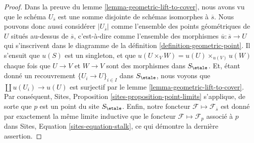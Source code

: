 \begin{proof}
Dans la preuve du
lemme \ref{lemma-geometric-lift-to-cover},
nous avons vu que le sch\'ema $U_{\overline{s}}$ est une somme disjointe de
sch\'emas isomorphes \`a $\overline{s}$. Nous pouvons donc aussi consid\'erer
$|U_{\overline{s}}|$ comme l'ensemble des points g\'eom\'etriques de $U$ situ\'es au-dessus de
$\overline{s}$, c'est-\`a-dire comme l'ensemble des morphismes
$\overline{u} : \overline{s} \to U$ qui s'inscrivent dans le diagramme de la
d\'efinition \ref{definition-geometric-point}.
Il s'ensuit que $u(S)$ est un singleton, et que
$u(U \times_V W) = u(U) \times_{u(V)} u(W)$
chaque fois que $U \to V$ et $W \to V$ sont des morphismes dans $S_\etale$.
Et, \'etant donn\'e un recouvrement $\{U_i \to U\}_{i \in I}$ dans $S_\etale$,
nous voyons que $\coprod u(U_i) \to u(U)$ est surjectif par le
lemme \ref{lemma-geometric-lift-to-cover}.
Par cons\'equent,
Sites, Proposition \ref{sites-proposition-point-limits}
s'applique, de sorte que $p$ est un point du site $S_\etale$.
Enfin, notre foncteur $\mathcal{F} \mapsto \mathcal{F}_{\overline{s}}$
est donn\'e par exactement la m\^eme limite inductive que le foncteur
$\mathcal{F} \mapsto \mathcal{F}_p$ associ\'e \`a $p$ dans
Sites, Equation \ref{sites-equation-stalk},
ce qui d\'emontre la derni\`ere assertion.
\end{proof}

